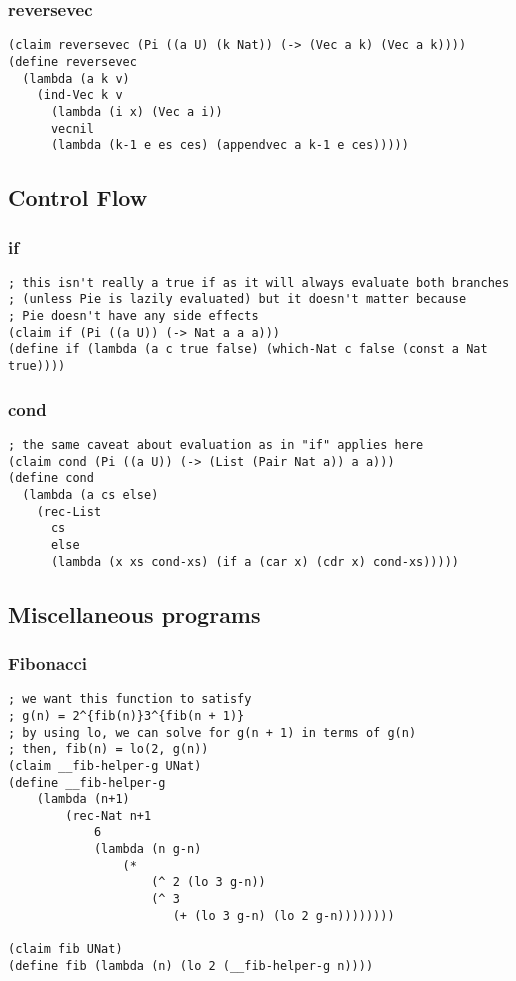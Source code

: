 \subsubsection{reversevec} \label{code:reversevec}
\begin{verbatim}
(claim reversevec (Pi ((a U) (k Nat)) (-> (Vec a k) (Vec a k))))
(define reversevec
  (lambda (a k v)
    (ind-Vec k v
      (lambda (i x) (Vec a i))
      vecnil
      (lambda (k-1 e es ces) (appendvec a k-1 e ces)))))

\end{verbatim}



\subsection{Control Flow}

\subsubsection{if} \label{code:if}
\begin{verbatim}
; this isn't really a true if as it will always evaluate both branches
; (unless Pie is lazily evaluated) but it doesn't matter because
; Pie doesn't have any side effects 
(claim if (Pi ((a U)) (-> Nat a a a)))
(define if (lambda (a c true false) (which-Nat c false (const a Nat true))))
\end{verbatim}

\subsubsection{cond} \label{code:cond}
\begin{verbatim}
; the same caveat about evaluation as in "if" applies here
(claim cond (Pi ((a U)) (-> (List (Pair Nat a)) a a)))
(define cond
  (lambda (a cs else)
    (rec-List
      cs
      else
      (lambda (x xs cond-xs) (if a (car x) (cdr x) cond-xs)))))
\end{verbatim}


\subsection{Miscellaneous programs}

\subsubsection{Fibonacci} \label{code:Fibonacci}
\begin{verbatim}
; we want this function to satisfy
; g(n) = 2^{fib(n)}3^{fib(n + 1)}
; by using lo, we can solve for g(n + 1) in terms of g(n)
; then, fib(n) = lo(2, g(n))
(claim __fib-helper-g UNat)
(define __fib-helper-g
    (lambda (n+1)
        (rec-Nat n+1
            6
            (lambda (n g-n) 
                (*
                    (^ 2 (lo 3 g-n))
                    (^ 3
                       (+ (lo 3 g-n) (lo 2 g-n))))))))

(claim fib UNat)
(define fib (lambda (n) (lo 2 (__fib-helper-g n))))
\end{verbatim}

